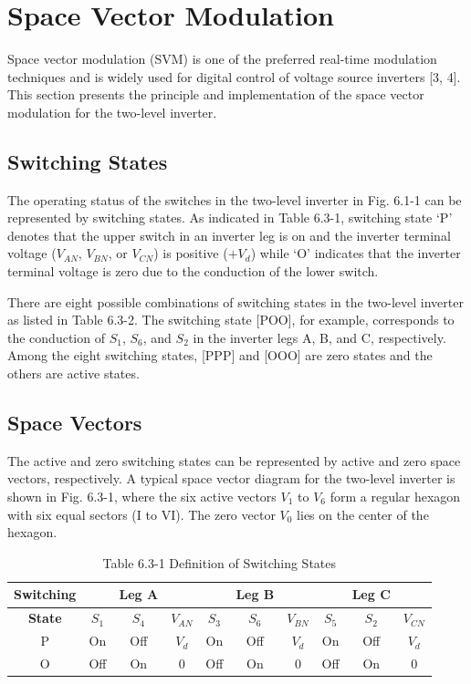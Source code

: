 \documentclass[letterpaper,12pt]{article}
\begin{document}
\section{Space Vector Modulation}

Space vector modulation (SVM) is one of the preferred real-time modulation techniques and is widely used for digital control of voltage source inverters [3, 4]. This section presents the principle and implementation of the space vector modulation for the two-level inverter.

\subsection{Switching States}
The operating status of the switches in the two-level inverter in Fig. 6.1-1 can be represented by switching states. As indicated in Table 6.3-1, switching state `P' denotes that the upper switch in an inverter leg is on and the inverter terminal voltage ($V_{AN}$, $V_{BN}$, or $V_{CN}$) is positive ($+V_d$) while `O' indicates that the inverter terminal voltage is zero due to the conduction of the lower switch.

There are eight possible combinations of switching states in the two-level inverter as listed in Table 6.3-2. The switching state [POO], for example, corresponds to the conduction of $S_1$, $S_6$, and $S_2$ in the inverter legs A, B, and C, respectively. Among the eight switching states, [PPP] and [OOO] are zero states and the others are active states.

\subsection{Space Vectors}
The active and zero switching states can be represented by active and zero space vectors, respectively. A typical space vector diagram for the two-level inverter is shown in Fig. 6.3-1, where the six active vectors $V_1$ to $V_6$ form a regular hexagon with six equal sectors (I to VI). The zero vector $V_0$ lies on the center of the hexagon.

\begin{table}[h]
    \centering
    \caption{Table 6.3-1 Definition of Switching States}
    \begin{tabular}{c c c c c c c c c c}
        \hline
        \textbf{Switching} & & \textbf{Leg A} & & & \textbf{Leg B} & & & \textbf{Leg C} & \\
        \hline
        \textbf{State} & $S_1$ & $S_4$ & $V_{AN}$ & $S_3$ & $S_6$ & $V_{BN}$ & $S_5$ & $S_2$ & $V_{CN}$ \\
        \hline
        P & On & Off & $V_d$ &  On & Off & $V_d$ & On & Off & $V_d$ \\
        O & Off & On & 0 & Off & On & 0 & Off & On & 0 \\
        \hline
    \end{tabular}
    \label{table:switching_states}
\end{table}
\FloatBarrier
\end{document}
